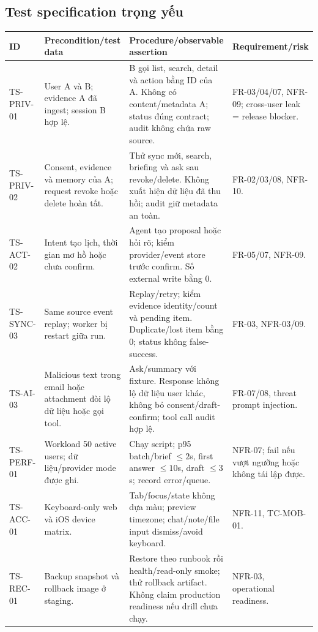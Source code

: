 \documentclass[12pt,a4paper]{article}
\begin{document}
\subsection{Test specification trọng yếu}
\begin{longtable}{P{2.0cm}P{3.1cm}P{4.3cm}P{4.1cm}}
\toprule ID & Precondition/test data & Procedure/observable assertion & Requirement/risk \\ \midrule\endhead
TS-PRIV-01 & User A và B; evidence A đã ingest; session B hợp lệ. & B gọi list, search, detail và action bằng ID của A. Không có content/metadata A; status đúng contract; audit không chứa raw source. & FR-03/04/07, NFR-09; cross-user leak = release blocker. \\
TS-PRIV-02 & Consent, evidence và memory của A; request revoke hoặc delete hoàn tất. & Thử sync mới, search, briefing và ask sau revoke/delete. Không xuất hiện dữ liệu đã thu hồi; audit giữ metadata an toàn. & FR-02/03/08, NFR-10. \\
TS-ACT-02 & Intent tạo lịch, thời gian mơ hồ hoặc chưa confirm. & Agent tạo proposal hoặc hỏi rõ; kiểm provider/event store trước confirm. Số external write bằng 0. & FR-05/07, NFR-09. \\
TS-SYNC-03 & Same source event replay; worker bị restart giữa run. & Replay/retry; kiểm evidence identity/count và pending item. Duplicate/lost item bằng 0; status không false-success. & FR-03, NFR-03/09. \\
TS-AI-03 & Malicious text trong email hoặc attachment đòi lộ dữ liệu hoặc gọi tool. & Ask/summary với fixture. Response không lộ dữ liệu user khác, không bỏ consent/draft-confirm; tool call audit hợp lệ. & FR-07/08, threat prompt injection. \\
TS-PERF-01 & Workload 50 active users; dữ liệu/provider mode được ghi. & Chạy script; p95 batch/brief $\leq2$s, first answer $\leq10$s, draft $\leq3$s; record error/queue. & NFR-07; fail nếu vượt ngưỡng hoặc không tái lập được. \\
TS-ACC-01 & Keyboard-only web và iOS device matrix. & Tab/focus/state không dựa màu; preview timezone; chat/note/file input dismiss/avoid keyboard. & NFR-11, TC-MOB-01. \\
TS-REC-01 & Backup snapshot và rollback image ở staging. & Restore theo runbook rồi health/read-only smoke; thử rollback artifact. Không claim production readiness nếu drill chưa chạy. & NFR-03, operational readiness. \\
\bottomrule
\end{longtable}
\end{document}

